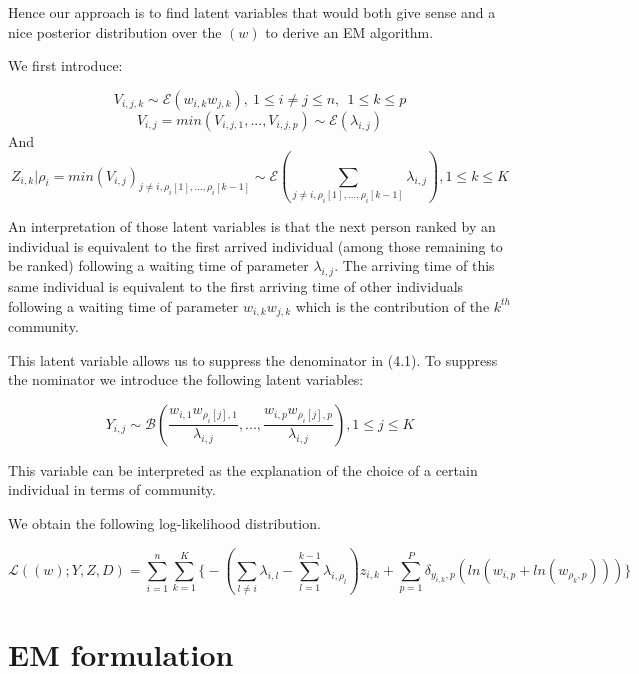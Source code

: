 \documentclass[12pt]{ociamthesis}  %
\begin{document}
	Hence our approach is to find latent variables that would both give sense and a nice posterior distribution over the $(w)$ to derive an EM algorithm.
	
	We first introduce:
	
	\begin{equation}
	V_{i,j,k} \sim \mathcal{E}(w_{i,k}w_{j,k}), \ 1 \leq i \neq j \leq n, \ \ 1 \leq k \leq p
	\end{equation}
	\begin{equation}
	V_{i,j} = min(V_{i,j,1},...,V_{i,j,p}) \sim \mathcal{E}(\lambda_{i,j})
	\end{equation}
	And
	\begin{equation}
	Z_{i,k} | \rho_{i} = min(V_{i,j})_{j \neq i, \rho_{i}[1],...,\rho_{i}[k-1]} \sim \mathcal{E}(\sum_{j \neq i, \rho_{i}[1],...,\rho_{i}[k-1]}\lambda_{i,j}), 1 \leq k \leq K
	\end{equation}
	
	An interpretation of those latent variables is that the next person ranked by an individual is equivalent to the first arrived individual (among those remaining to be ranked) following a waiting time of parameter $\lambda_{i,j}$. The arriving time of this same individual is equivalent to the first arriving time of other individuals following a waiting time of parameter $w_{i,k}w_{j,k}$ which is the contribution of the $k^{th}$ community.
	
	This latent variable allows us to suppress the denominator in (4.1). To suppress the nominator we introduce the following latent variables:
	
	\begin{equation}
	Y_{i,j} \sim \mathcal{B}(\frac{w_{i,1}w_{\rho_{i}[j],1}}{\lambda_{i,j}}, ..., \frac{w_{i,p}w_{\rho_{i}[j],p}}{\lambda_{i,j}}), 1 \leq j \leq K
	\end{equation}
	
	This variable can be interpreted as the explanation of the choice of a certain individual in terms of community.
	
	We obtain the following log-likelihood distribution.
	
	\begin{equation}
	\mathcal{L}((w);Y,Z,D) = \sum_{i = 1}^{n} \sum_{k = 1}^{K} \bigg\{ -(\sum_{l \neq i} \lambda_{i,l} - \sum_{l = 1}^{k - 1} \lambda_{i,\rho_{l}})z_{i,k} + \sum_{p = 1}^{P} \delta_{y_{i,k}, p} (ln(w_{i,p} + ln(w_{\rho_{k},p}))) \bigg\}
	\end{equation}
	
	\section{EM formulation}
	
\end{document}
